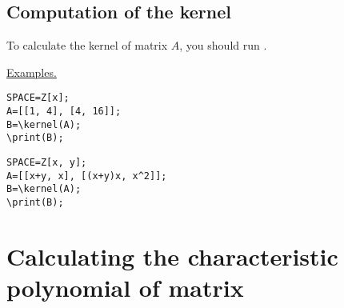  \subsection{Computation of the kernel} 

To calculate the kernel of matrix $A$, you should run . 

\underline{Examples. }

\vspace*{-2mm}
\begin{verbatim}
SPACE=Z[x]; 
A=[[1, 4], [4, 16]];
B=\kernel(A); 
\print(B);
\end{verbatim}


\begin{verbatim}
SPACE=Z[x, y]; 
A=[[x+y, x], [(x+y)x, x^2]];
B=\kernel(A); 
\print(B);
\end{verbatim}


\section{Calculating the characteristic polynomial of matrix}  
 
